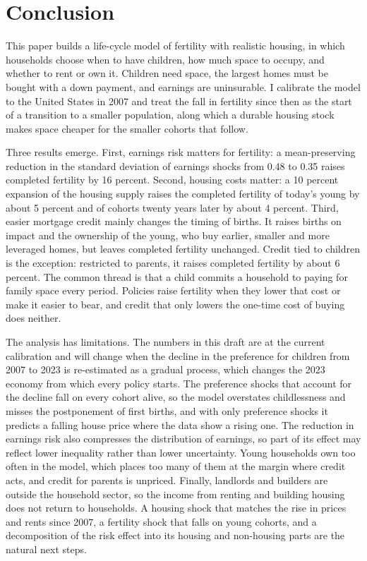 \section{Conclusion}
\label{sec:conclusion}

This paper builds a life-cycle model of fertility with realistic housing, in
which households choose when to have children, how much space to occupy, and
whether to rent or own it. Children need space, the largest homes must be
bought with a down payment, and earnings are uninsurable. I calibrate the
model to the United States in 2007 and treat the fall in fertility since then
as the start of a transition to a smaller population, along which a durable
housing stock makes space cheaper for the smaller cohorts that follow.

Three results emerge. First, earnings risk matters for fertility: a
mean-preserving reduction in the standard deviation of earnings shocks from
0.48 to 0.35 raises completed fertility by 16 percent. Second, housing costs
matter: a 10 percent expansion of the housing supply raises the completed
fertility of today's young by about 5 percent and of cohorts twenty years
later by about 4 percent. Third, easier mortgage credit mainly changes the
timing of births. It raises births on impact and the ownership of the young,
who buy earlier, smaller and more leveraged homes, but leaves completed
fertility unchanged. Credit tied to children is the exception: restricted to
parents, it raises completed fertility by about 6 percent. The common thread
is that a child commits a household to paying for family space every period.
Policies raise fertility when they lower that cost or make it easier to bear,
and credit that only lowers the one-time cost of buying does neither.

The analysis has limitations. The numbers in this draft are at the current
calibration and will change when the decline in the preference for children
from 2007 to 2023 is re-estimated as a gradual process, which changes the 2023
economy from which every policy starts. The preference shocks that account for
the decline fall on every cohort alive, so the model overstates childlessness
and misses the postponement of first births, and with only preference shocks
it predicts a falling house price where the data show a rising one. The
reduction in earnings risk also compresses the distribution of earnings, so
part of its effect may reflect lower inequality rather than lower uncertainty.
Young households own too often in the model, which places too many of them at
the margin where credit acts, and credit for parents is unpriced. Finally,
landlords and builders are outside the household sector, so the income from
renting and building housing does not return to households. A housing shock
that matches the rise in prices and rents since 2007, a fertility shock that
falls on young cohorts, and a decomposition of the risk effect into its
housing and non-housing parts are the natural next steps.
